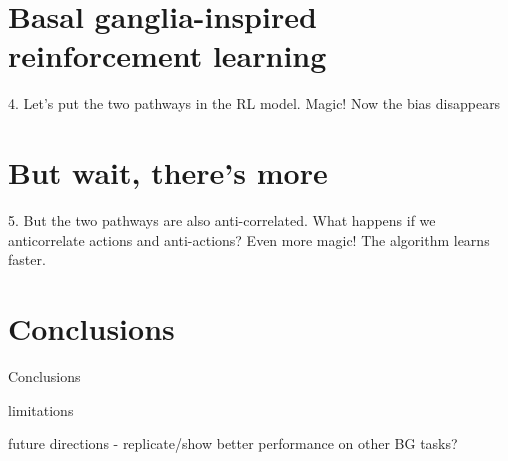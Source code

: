 \documentclass[11pt]{article} %
\begin{document}
\section{Basal ganglia-inspired reinforcement learning}

4. Let's put the two pathways in the  RL model. Magic! Now the bias disappears

\section{But wait, there's more}

5. But the two pathways are also anti-correlated. What happens if we anticorrelate actions and anti-actions? Even more magic! The algorithm learns faster.

\section{Conclusions}

Conclusions

limitations

future directions - replicate/show better performance on other BG tasks?
\end{document}
